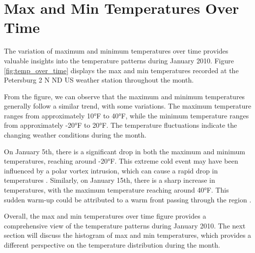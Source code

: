 \documentclass{article}
\begin{document}
\section{Max and Min Temperatures Over Time}

The variation of maximum and minimum temperatures over time provides valuable insights into the temperature patterns during January 2010. Figure \ref{fig:temp_over_time} displays the max and min temperatures recorded at the Petersburg 2 N ND US weather station throughout the month.

From the figure, we can observe that the maximum and minimum temperatures generally follow a similar trend, with some variations. The maximum temperature ranges from approximately 10°F to 40°F, while the minimum temperature ranges from approximately -20°F to 20°F. The temperature fluctuations indicate the changing weather conditions during the month.

On January 5th, there is a significant drop in both the maximum and minimum temperatures, reaching around -20°F. This extreme cold event may have been influenced by a polar vortex intrusion, which can cause a rapid drop in temperatures \cite{polar_vortex}. Similarly, on January 15th, there is a sharp increase in temperatures, with the maximum temperature reaching around 40°F. This sudden warm-up could be attributed to a warm front passing through the region \cite{warm_front}.

Overall, the max and min temperatures over time figure provides a comprehensive view of the temperature patterns during January 2010. The next section will discuss the histogram of max and min temperatures, which provides a different perspective on the temperature distribution during the month.



\end{document}
